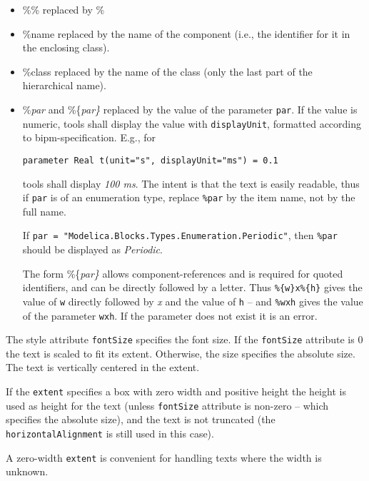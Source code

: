 \begin{itemize}
\item
  \%\% replaced by \%
\item
  \%name replaced by the name of the component (i.e., the identifier for
  it in the enclosing class).
\item
  \%class replaced by the name of the class (only the last part of the hierarchical name).
\item
  \%\emph{par} and \%\{\emph{par\}} replaced by the value of the
  parameter \lstinline!par!.
  If the value is numeric, tools shall display the value with \lstinline!displayUnit!, formatted according to bipm-specification.
  E.g., for
\begin{lstlisting}[language=modelica]
parameter Real t(unit="s", displayUnit="ms") = 0.1
\end{lstlisting}
  tools shall display \emph{100 ms}.
  The intent is that the text is easily readable,
  thus if \lstinline!par! is of an enumeration type, replace \lstinline!%par! by the item name,
  not by the full name.
  \begin{example}
  If \lstinline!par = "Modelica.Blocks.Types.Enumeration.Periodic"!, then \lstinline!%par! should be displayed as \emph{Periodic}.
  \end{example}
  The form \%\{\emph{par\}} allows component-references and is required for quoted identifiers, and can be directly
  followed by a letter. Thus \lstinline!%{w}x%{h}! gives the value of \lstinline!w!
  directly followed by \emph{x} and the value of \lstinline!h! -- and \lstinline!%wxh! gives the value of the
  parameter \lstinline!wxh!. If the parameter does not exist it is an error.
\end{itemize}

The style attribute \lstinline!fontSize! specifies the font size. If the \lstinline!fontSize!
attribute is 0 the text is scaled to fit its extent. Otherwise, the size
specifies the absolute size. The text is vertically centered in the extent.

If the \lstinline!extent! specifies a box with zero width and positive height the
height is used as height for the text (unless \lstinline!fontSize! attribute is
non-zero -- which specifies the absolute size), and the text is not
truncated (the \lstinline!horizontalAlignment! is still used in this case).

\begin{nonnormative}
A zero-width \lstinline!extent! is convenient for handling texts where the width is unknown.
\end{nonnormative}

